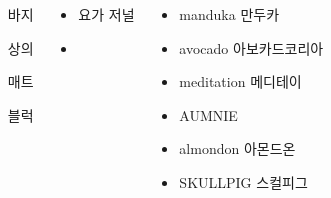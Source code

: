 \documentclass[25pt, a1paper ]{tikzposter}
\begin{document}
\begin{columns}
{		}		




			{				
			\setlength{\leftmargini}{5em}			
			\setlength{\labelsep}{1em} %
			\begin{LARGE}
			\begin{itemize}
			\item [바지]
			\item [상의]
			\item [매트]
			\item [블럭]
			\end{itemize}
			\end{LARGE}
		}


			{				
			\setlength{\leftmargini}{3em}			
			\setlength{\labelsep}{1em} %
			\begin{LARGE}
			\begin{itemize}
			\item 요가 저널
			\item 
			\end{itemize}
			\end{LARGE}
		}


			{				
			\setlength{\leftmargini}{3em}			
			\setlength{\labelsep}{1em} %
			\begin{LARGE}
			\begin{itemize}
			\item manduka 만두카
			\item avocado 아보카드코리아
			\item meditation 메디테이
			\item AUMNIE
			\item almondon 아몬드온
			\item SKULLPIG 스컬피그

			\end{itemize}
			\end{LARGE}
		}


	\end{columns}
\end{document}
